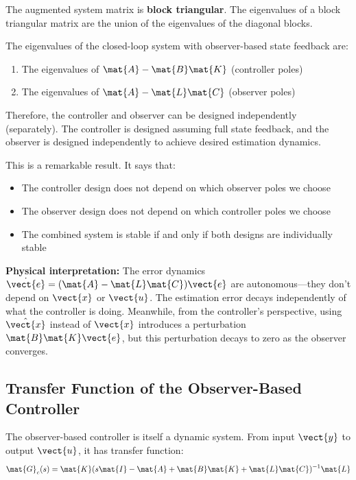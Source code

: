 The augmented system matrix is \textbf{block triangular}. The eigenvalues of a block triangular matrix are the union of the eigenvalues of the diagonal blocks.

\begin{theorem}
\label{thm:separation_principle}
The eigenvalues of the closed-loop system with observer-based state feedback are:
\begin{enumerate}
    \item The eigenvalues of $\mat{A} - \mat{B}\mat{K}$ (controller poles)
    \item The eigenvalues of $\mat{A} - \mat{L}\mat{C}$ (observer poles)
\end{enumerate}
Therefore, the controller and observer can be designed independently (separately). The controller is designed assuming full state feedback, and the observer is designed independently to achieve desired estimation dynamics.
\end{theorem}

This is a remarkable result. It says that:
\begin{itemize}
    \item The controller design does not depend on which observer poles we choose
    \item The observer design does not depend on which controller poles we choose
    \item The combined system is stable if and only if both designs are individually stable
\end{itemize}

\textbf{Physical interpretation:} The error dynamics $\dot{\vect{e}} = (\mat{A} - \mat{L}\mat{C})\vect{e}$ are autonomous---they don't depend on $\vect{x}$ or $\vect{u}$. The estimation error decays independently of what the controller is doing. Meanwhile, from the controller's perspective, using $\hat{\vect{x}}$ instead of $\vect{x}$ introduces a perturbation $\mat{B}\mat{K}\vect{e}$, but this perturbation decays to zero as the observer converges.

\subsection{Transfer Function of the Observer-Based Controller}

The observer-based controller is itself a dynamic system. From input $\vect{y}$ to output $\vect{u}$, it has transfer function:
\begin{equation}
\mat{G}_c(s) = \mat{K}(s\mat{I} - \mat{A} + \mat{B}\mat{K} + \mat{L}\mat{C})^{-1}\mat{L}
\label{eq:controller_transfer_function}
\end{equation}

